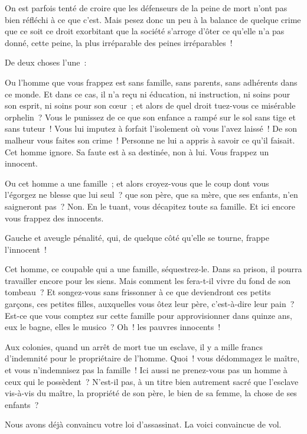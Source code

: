 \documentclass[french,twoside]{book} %
\begin{document}
On est parfois tenté de croire que les défenseurs de la peine de mort n’ont pas bien réfléchi à ce que c’est. Mais pesez donc un peu à la balance de quelque crime que ce soit ce droit exorbitant que la société s’arroge d’ôter ce qu’elle n’a pas donné, cette peine, la plus irréparable des peines irréparables !\par
De deux choses l’une :\par
Ou l’homme que vous frappez est sans famille, sans parents, sans adhérents dans ce monde. Et dans ce cas, il n’a reçu ni éducation, ni instruction, ni soins pour son esprit, ni soins pour son cœur ; et alors de quel droit tuez-vous ce misérable orphelin ? Vous le punissez de ce que  son enfance a rampé sur le sol sans tige et sans tuteur ! Vous lui imputez à forfait l’isolement où vous l’avez laissé ! De son malheur vous faites son crime ! Personne ne lui a appris à savoir ce qu’il faisait. Cet homme ignore. Sa faute est à sa destinée, non à lui. Vous frappez un innocent.\par
Ou cet homme a une famille ; et alors croyez-vous que le coup dont vous l’égorgez ne blesse que lui seul ? que son père, que sa mère, que ses enfants, n’en saigneront pas ? Non. En le tuant, vous décapitez toute sa famille. Et ici encore vous frappez des innocents.\par
Gauche et aveugle pénalité, qui, de quelque côté qu’elle se tourne, frappe l’innocent !\par
Cet homme, ce coupable qui a une famille, séquestrez-le. Dans sa prison, il pourra travailler encore pour les siens. Mais comment les fera-t-il vivre du fond de son tombeau ? Et songez-vous sans frissonner à ce que deviendront ces petits garçons, ces petites filles, auxquelles vous ôtez leur père, c’est-à-dire leur pain ? Est-ce que vous comptez sur cette famille pour approvisionner dans quinze ans, eux le bagne, elles le musico ? Oh ! les pauvres innocents !\par
Aux colonies, quand un arrêt de mort tue un esclave, il y a mille francs d’indemnité pour le propriétaire de l’homme. Quoi ! vous dédommagez le maître, et vous n’indemnisez pas la famille ! Ici aussi ne prenez-vous pas un homme à ceux qui le possèdent ? N’est-il pas, à un titre bien autrement sacré que l’esclave vis-à-vis du maître, la propriété de son père, le bien de sa femme, la chose de ses enfants ?\par
Nous avons déjà convaincu votre loi d’assassinat. La voici convaincue de vol.\par
\end{document}
